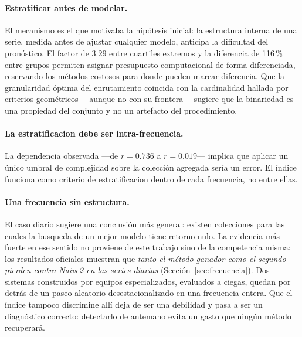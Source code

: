 \paragraph{Estratificar antes de modelar.} El mecanismo es el que motivaba la hipótesis
inicial: la estructura interna de una serie, medida antes de ajustar cualquier modelo,
anticipa la dificultad del pronóstico. El factor de 3.29 entre cuartiles extremos y la
diferencia de 116\,\% entre grupos permiten asignar presupuesto computacional de forma
diferenciada, reservando los métodos costosos para donde pueden marcar diferencia. Que la
granularidad óptima del enrutamiento coincida con la cardinalidad hallada por criterios
geométricos ---aunque no con su frontera--- sugiere que la binariedad es una propiedad del
conjunto y no un artefacto del procedimiento.

\paragraph{La estratificacion debe ser intra-frecuencia.} La dependencia observada
---de $r=0.736$ a $r=0.019$--- implica que aplicar un único umbral de complejidad
sobre la colección agregada sería un error. El índice funciona como criterio de
estratificacion dentro de cada frecuencia, no entre ellas.

\paragraph{Una frecuencia sin estructura.} El caso diario sugiere una conclusión
más general: existen colecciones para las cuales la busqueda de un mejor modelo
tiene retorno nulo. La evidencia más fuerte en ese sentido no proviene de este
trabajo sino de la competencia misma: los resultados oficiales muestran que
\emph{tanto el método ganador como el segundo pierden contra Naive2 en las series
diarias} (Sección~\ref{sec:frecuencia}). Dos sistemas construidos por equipos
especializados, evaluados a ciegas, quedan por detrás de un paseo aleatorio
desestacionalizado en una frecuencia entera. Que el índice tampoco discrimine allí deja de
ser una debilidad y pasa a ser un diagnóstico correcto: detectarlo de antemano evita un
gasto que ningún método recuperará.

